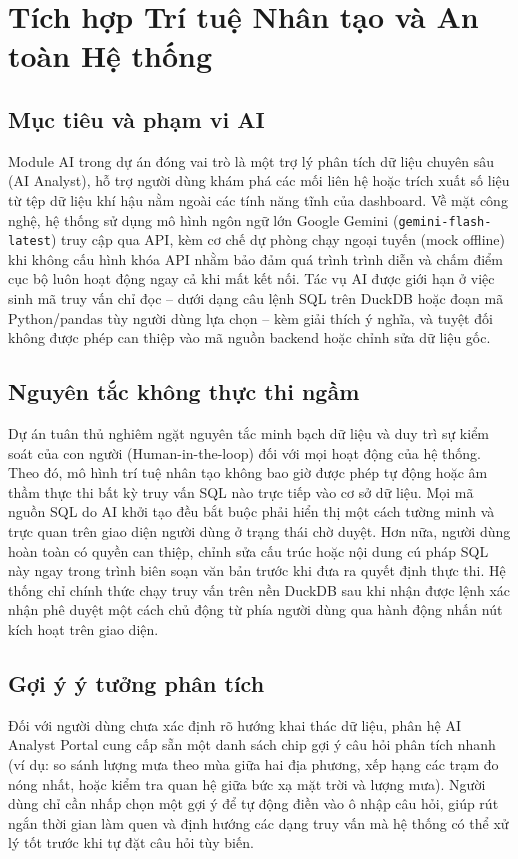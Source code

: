 \chapter{Tích hợp Trí tuệ Nhân tạo và An toàn Hệ thống}

\section{Mục tiêu và phạm vi AI}
Module AI trong dự án đóng vai trò là một trợ lý phân tích dữ liệu chuyên sâu (AI Analyst), hỗ trợ người dùng khám phá các mối liên hệ hoặc trích xuất số liệu từ tệp dữ liệu khí hậu nằm ngoài các tính năng tĩnh của dashboard. Về mặt công nghệ, hệ thống sử dụng mô hình ngôn ngữ lớn Google Gemini (\texttt{gemini-flash-latest}) truy cập qua API, kèm cơ chế dự phòng chạy ngoại tuyến (mock offline) khi không cấu hình khóa API nhằm bảo đảm quá trình trình diễn và chấm điểm cục bộ luôn hoạt động ngay cả khi mất kết nối. Tác vụ AI được giới hạn ở việc sinh mã truy vấn chỉ đọc -- dưới dạng câu lệnh SQL trên DuckDB hoặc đoạn mã Python/pandas tùy người dùng lựa chọn -- kèm giải thích ý nghĩa, và tuyệt đối không được phép can thiệp vào mã nguồn backend hoặc chỉnh sửa dữ liệu gốc.

\section{Nguyên tắc không thực thi ngầm}
Dự án tuân thủ nghiêm ngặt nguyên tắc minh bạch dữ liệu và duy trì sự kiểm soát của con người (Human-in-the-loop) đối với mọi hoạt động của hệ thống. Theo đó, mô hình trí tuệ nhân tạo không bao giờ được phép tự động hoặc âm thầm thực thi bất kỳ truy vấn SQL nào trực tiếp vào cơ sở dữ liệu. Mọi mã nguồn SQL do AI khởi tạo đều bắt buộc phải hiển thị một cách tường minh và trực quan trên giao diện người dùng ở trạng thái chờ duyệt. Hơn nữa, người dùng hoàn toàn có quyền can thiệp, chỉnh sửa cấu trúc hoặc nội dung cú pháp SQL này ngay trong trình biên soạn văn bản trước khi đưa ra quyết định thực thi. Hệ thống chỉ chính thức chạy truy vấn trên nền DuckDB sau khi nhận được lệnh xác nhận phê duyệt một cách chủ động từ phía người dùng qua hành động nhấn nút kích hoạt trên giao diện.

\section{Gợi ý ý tưởng phân tích}
Đối với người dùng chưa xác định rõ hướng khai thác dữ liệu, phân hệ AI Analyst Portal cung cấp sẵn một danh sách chip gợi ý câu hỏi phân tích nhanh (ví dụ: so sánh lượng mưa theo mùa giữa hai địa phương, xếp hạng các trạm đo nóng nhất, hoặc kiểm tra quan hệ giữa bức xạ mặt trời và lượng mưa). Người dùng chỉ cần nhấp chọn một gợi ý để tự động điền vào ô nhập câu hỏi, giúp rút ngắn thời gian làm quen và định hướng các dạng truy vấn mà hệ thống có thể xử lý tốt trước khi tự đặt câu hỏi tùy biến.

